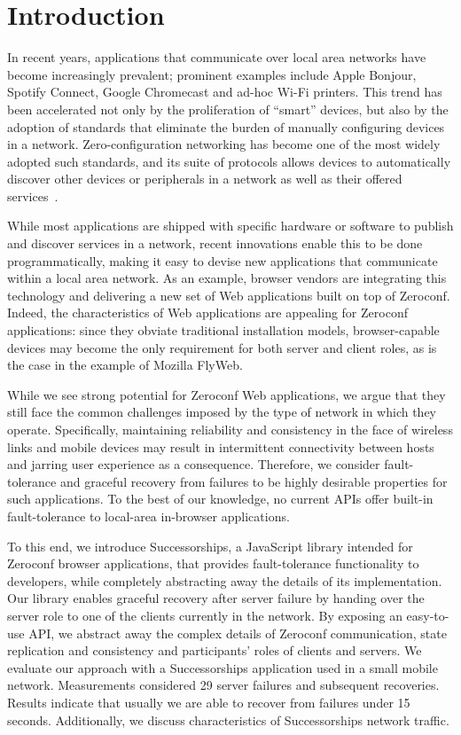 \section{Introduction}
\label{sec:introduction}

In recent years, applications that communicate over local area networks have become increasingly prevalent; prominent examples include Apple Bonjour, Spotify Connect, Google Chromecast and ad-hoc Wi-Fi printers.
This trend has been accelerated not only by the proliferation of ``smart'' devices, but also by the adoption of standards that eliminate the burden of manually configuring devices in a network.
Zero-configuration networking has become one of the most widely adopted such standards, and its suite of protocols allows devices to automatically discover other devices or peripherals in a network as well as their offered services~\cite{rfc6762, rfc6763}.

While most applications are shipped with specific hardware or software to publish and discover services in a network, recent innovations enable this to be done programmatically, making it easy to devise new applications that communicate within a local area network.
As an example, browser vendors are integrating this technology and delivering a new set of Web applications built on top of Zeroconf.
Indeed, the characteristics of Web applications are appealing for Zeroconf applications: since they obviate traditional installation models, browser-capable devices may become the only requirement for both server and client roles, as is the case in the example of Mozilla FlyWeb.

While we see strong potential for Zeroconf Web applications, we argue that they still face the common challenges imposed by the type of network in which they operate.
Specifically, maintaining reliability and consistency in the face of wireless links and mobile devices may result in intermittent connectivity between hosts and jarring user experience as a consequence.
Therefore, we consider fault-tolerance and graceful recovery from failures to be highly desirable properties for such applications.
To the best of our knowledge, no current APIs offer built-in fault-tolerance to local-area in-browser applications.

To this end, we introduce Successorships, a JavaScript library intended for Zeroconf browser applications, that provides fault-tolerance functionality to developers, while completely abstracting away the details of its implementation.
Our library enables graceful recovery after server failure by handing over the server role to one of the clients currently in the network.
By exposing an easy-to-use API, we abstract away the complex details of Zeroconf communication, state replication and consistency and participants' roles of clients and servers.
We evaluate our approach with a Successorships application used in a small mobile network.
Measurements considered 29 server failures and subsequent recoveries.
Results indicate that usually we are able to recover from failures under 15 seconds.
Additionally, we discuss characteristics of Successorships network traffic.

